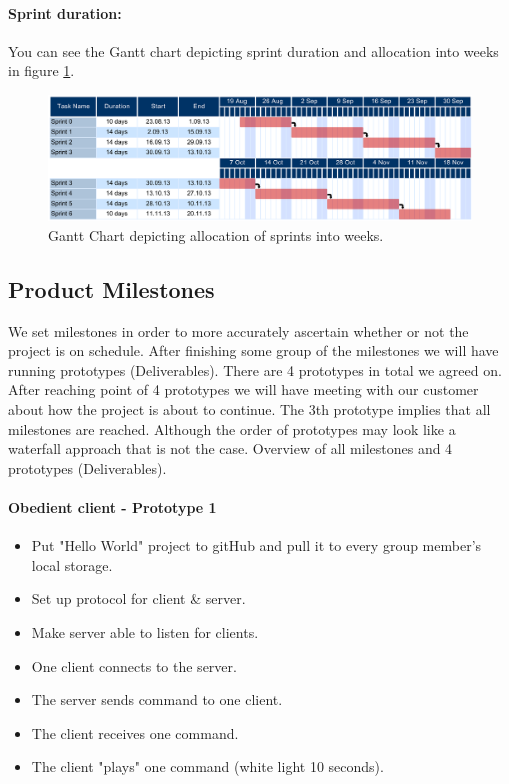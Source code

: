 \paragraph{Sprint duration:}

You can see the Gantt chart depicting sprint duration and allocation into weeks in figure \ref{fig:gantt}.
\begin{figure}[!h]
	\centering
		\includegraphics[width=18cm, angle=90]{planning/gantt.pdf}
	\caption{Gantt Chart depicting allocation of sprints into weeks.}
	\label{fig:gantt}
\end{figure}

\subsection{Product Milestones}

We set milestones in order to more accurately ascertain whether or not the project is on schedule. After finishing some group of the milestones we will have running prototypes (Deliverables). There are 4 prototypes in total we 
agreed on. After reaching point of 4 prototypes we will have meeting with our customer about how the project is about to continue. The 3th prototype implies that all milestones are reached. 
Although the order of prototypes may look like a waterfall approach that is not the case.
Overview of all milestones and 4 prototypes (Deliverables).

\paragraph{Obedient client  - Prototype 1}
\begin{itemize}
	\item Put "Hello World" project to gitHub and pull it to every group member's local storage.
	\item Set up protocol for client \& server.
	\item Make server able to listen for clients.
	\item One client connects to the server.
	\item The server sends command to one client.
	\item The client receives one command.
	\item The client "plays" one command (white light 10 seconds).
\end{itemize}

